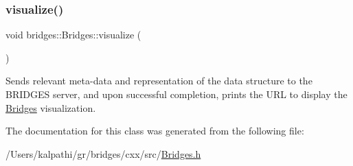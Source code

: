 \subsubsection{\texorpdfstring{visualize()}{visualize()}}
{\footnotesize\ttfamily void bridges\+::\+Bridges\+::visualize (\begin{DoxyParamCaption}{ }\end{DoxyParamCaption})\hspace{0.3cm}{\ttfamily [inline]}}

Sends relevant meta-\/data and representation of the data structure to the B\+R\+I\+D\+G\+ES server, and upon successful completion, prints the U\+RL to display the \mbox{\hyperlink{classbridges_1_1_bridges}{Bridges}} visualization. 

The documentation for this class was generated from the following file\+:\begin{DoxyCompactItemize}
\item 
/\+Users/kalpathi/gr/bridges/cxx/src/\mbox{\hyperlink{_bridges_8h}{Bridges.\+h}}\end{DoxyCompactItemize}
